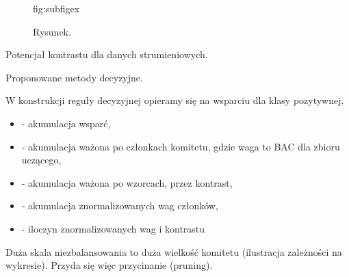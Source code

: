 \documentclass[pmlr]{jmlr}
\begin{document}
\begin{figure}[!h]
\floatconts
  {fig:subfigex}
  {\caption{Rysunek.}}
  {%
  }
\end{figure}

Potencjał kontrastu dla danych strumieniowych.

Proponowane metody decyzyjne.

W konstrukcji reguły decyzyjnej opieramy się na wsparciu dla klasy pozytywnej.

\begin{itemize}
	\item - akumulacja wsparć,
	\item - akumulacja ważona po członkach komitetu, gdzie waga to BAC dla zbioru uczącego,
	\item - akumulacja ważona po wzorcach, przez kontrast,
	\item - akumulacja znormalizowanych wag członków,
	\item - iloczyn znormalizowanych wag i kontrastu
\end{itemize}

Duża skala niezbalansowania to duża wielkość komitetu (ilustracja zależności na wykresie). Przyda się więc przycinanie (pruning).
\end{document}
